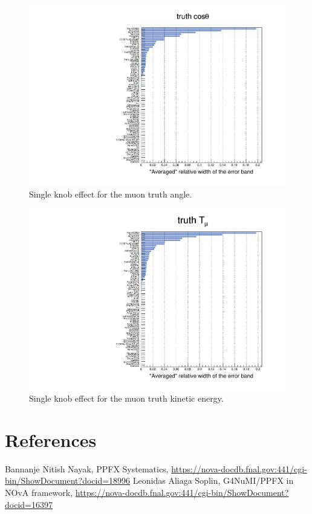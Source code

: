 \documentclass[12pt,a4paper,final]{iopart}
\begin{document}
\begin{figure}[h]
  \centering
  \includegraphics[width=\textwidth]{figures/t_cos.pdf}
  \caption{Single knob effect for the muon truth angle.}
  \label{fig:true_mu_ang}
\end{figure}

\begin{figure}[h]
  \centering
  \includegraphics[width=\textwidth]{figures/t_muke.pdf}
  \caption{Single knob effect for the muon truth kinetic energy.}
  \label{fig:true_mu_ke}
\end{figure}

\section*{References}
\begin{thebibliography}{10}
   Bannanje Nitish Nayak, PPFX Systematics, \url{https://nova-docdb.fnal.gov:441/cgi-bin/ShowDocument?docid=18996}
   Leonidas Aliaga Soplin, G4NuMI/PPFX in NOvA framework, \url{https://nova-docdb.fnal.gov:441/cgi-bin/ShowDocument?docid=16397}
\end{thebibliography}
  
\end{document}
